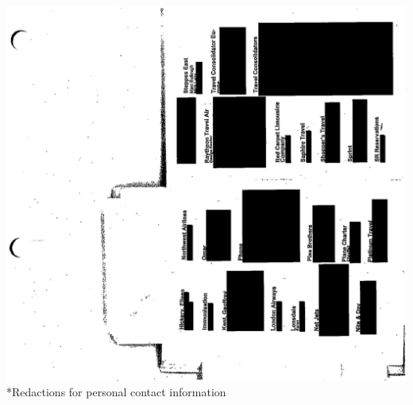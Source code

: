 \documentclass[10pt]{article}
\begin{document}
\includegraphics[max width=\textwidth, center]{2025_02_27_dd68c3d38de88f0516d9g-211}\\
*Redactions for personal contact information
\end{document}
